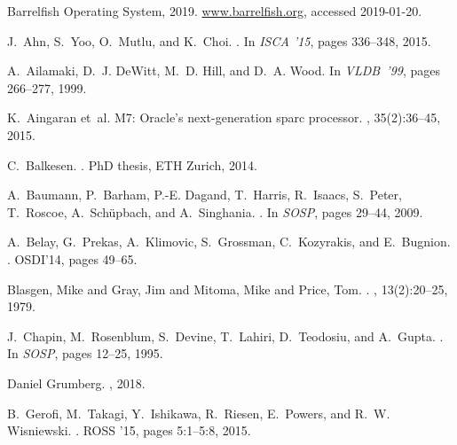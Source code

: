 \documentclass[11pt]{article}
\begin{document}
\begin{thebibliography}{10}
\itemsep=1pt
\begin{small}

{Barrelfish {O}perating {S}ystem}, 2019.
\newblock \url{www.barrelfish.org}, accessed 2019-01-20.

J.~Ahn, S.~Yoo, O.~Mutlu, and K.~Choi.
.
\newblock In {\em ISCA '15}, pages 336--348, 2015.

A.~Ailamaki, D.~J. DeWitt, M.~D. Hill, and D.~A. Wood.
\newblock In {\em VLDB~'99}, pages 266--277, 1999.

K.~Aingaran et~al.
\newblock M7: Oracle's next-generation sparc processor.
, 35(2):36--45, 2015.

C.~Balkesen.
.
\newblock PhD thesis, ETH Zurich, 2014.

A.~Baumann, P.~Barham, P.-E. Dagand, T.~Harris, R.~Isaacs, S.~Peter, T.~Roscoe,
  A.~Sch\"{u}pbach, and A.~Singhania.
.
\newblock In {\em SOSP}, pages 29--44, 2009.

A.~Belay, G.~Prekas, A.~Klimovic, S.~Grossman, C.~Kozyrakis, and E.~Bugnion.
.
\newblock OSDI'14, pages 49--65.

{Blasgen, Mike and Gray, Jim and Mitoma, Mike and Price, Tom}.
.
, 13(2):20--25, 1979.

J.~Chapin, M.~Rosenblum, S.~Devine, T.~Lahiri, D.~Teodosiu, and A.~Gupta.
.
\newblock In {\em SOSP}, pages 12--25, 1995.

{Daniel Grumberg}.
, 2018.

B.~Gerofi, M.~Takagi, Y.~Ishikawa, R.~Riesen, E.~Powers, and R.~W. Wisniewski.
.
\newblock ROSS '15, pages 5:1--5:8, 2015.


\end{small}
\end{thebibliography}
\end{document}
